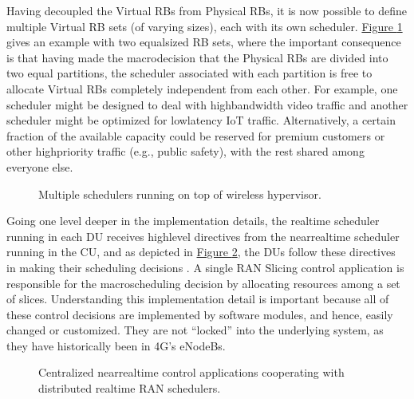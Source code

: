 \documentclass[a4paper,11pt,english]{sphinxmanual}
\let\sphinxpxdimen\pdfpxdimen\else\newdimen\sphinxpxdimen
\begin{document}
\sphinxAtStartPar
Having decoupled the Virtual RBs from Physical RBs, it is now possible
to define multiple Virtual RB sets (of varying sizes), each with its own
scheduler. \hyperref[\detokenize{disaggregate:fig-multi-sched}]{Figure \ref{\detokenize{disaggregate:fig-multi-sched}}} gives an example with two
equal\sphinxhyphen{}sized RB sets, where the important consequence is that having made
the macro\sphinxhyphen{}decision that the Physical RBs are divided into two equal
partitions, the scheduler associated with each partition is free to
allocate Virtual RBs completely independent from each other. For
example, one scheduler might be designed to deal with high\sphinxhyphen{}bandwidth
video traffic and another scheduler might be optimized for low\sphinxhyphen{}latency
IoT traffic. Alternatively, a certain fraction of the available capacity
could be reserved for premium customers or other high\sphinxhyphen{}priority traffic
(e.g., public safety), with the rest shared among everyone else.

\begin{figure}[ht]
\centering
\capstart

\noindent\sphinxincludegraphics[width=600\sphinxpxdimen]{{Slide29}.png}
\caption{Multiple schedulers running on top of wireless
hypervisor.}\label{\detokenize{disaggregate:id7}}\label{\detokenize{disaggregate:fig-multi-sched}}\end{figure}

\sphinxAtStartPar
Going one level deeper in the implementation details, the real\sphinxhyphen{}time
scheduler running in each DU receives high\sphinxhyphen{}level directives from the
near\sphinxhyphen{}real\sphinxhyphen{}time scheduler running in the CU, and as depicted in
\hyperref[\detokenize{disaggregate:fig-slicing-control}]{Figure \ref{\detokenize{disaggregate:fig-slicing-control}}}, the DUs follow these
directives in making their scheduling decisions . A single RAN Slicing control application is responsible for the
macro\sphinxhyphen{}scheduling decision by allocating resources among a set of
slices. Understanding this implementation detail is important because
all of these control decisions are implemented by software modules,
and hence, easily changed or customized. They are not “locked” into
the underlying system, as they have historically been in 4G’s eNodeBs.

\begin{figure}[ht]
\centering
\capstart

\noindent\sphinxincludegraphics[width=350\sphinxpxdimen]{{Slide30}.png}
\caption{Centralized near\sphinxhyphen{}real\sphinxhyphen{}time control applications
cooperating with distributed real\sphinxhyphen{}time RAN schedulers.}\label{\detokenize{disaggregate:id8}}\label{\detokenize{disaggregate:fig-slicing-control}}\end{figure}
\end{document}
